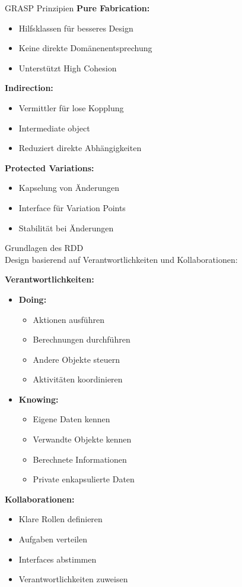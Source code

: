 \begin{concept}{GRASP Prinzipien}
\textbf{Pure Fabrication:}
\begin{itemize}
    \item Hilfsklassen für besseres Design
    \item Keine direkte Domänenentsprechung
    \item Unterstützt High Cohesion
\end{itemize}

\textbf{Indirection:}
\begin{itemize}
    \item Vermittler für lose Kopplung
    \item Intermediate object
    \item Reduziert direkte Abhängigkeiten
\end{itemize}

\textbf{Protected Variations:}
\begin{itemize}
    \item Kapselung von Änderungen
    \item Interface für Variation Points
    \item Stabilität bei Änderungen
\end{itemize}
\end{concept}

\begin{concept}{Grundlagen des RDD}\\
Design basierend auf Verantwortlichkeiten und Kollaborationen:

\textbf{Verantwortlichkeiten:}
\begin{itemize}
    \item \textbf{Doing:}
    \begin{itemize}
        \item Aktionen ausführen
        \item Berechnungen durchführen
        \item Andere Objekte steuern
        \item Aktivitäten koordinieren
    \end{itemize}
    
    \item \textbf{Knowing:}
    \begin{itemize}
        \item Eigene Daten kennen
        \item Verwandte Objekte kennen
        \item Berechnete Informationen
        \item Private enkapsulierte Daten
    \end{itemize}
\end{itemize}

\textbf{Kollaborationen:}
\begin{itemize}
    \item Klare Rollen definieren
    \item Aufgaben verteilen
    \item Interfaces abstimmen
    \item Verantwortlichkeiten zuweisen
\end{itemize}
\end{concept}

